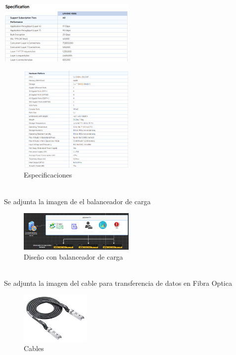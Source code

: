     \includegraphics[width=0.5\textwidth]{assets/sp1.png}\\
    \begin{figure}[htb]
        \centering
        \includegraphics[width=0.5\textwidth]{assets/sp2.png}
        \caption{Especificaciones}
        \label{fig:modelo}
        \end{figure}
        \label{sec:Background} \\
    
        Se adjunta la imagen de el balanceador de carga
        \begin{figure}[htb]
        \centering
        \includegraphics[width=0.5\textwidth]{assets/dbc.png}
        \caption{Diseño con balanceador de carga}
        \label{fig:modelo}
        \end{figure}
        \label{sec:Background} \\

        Se adjunta la imagen del cable para transferencia de datos en Fibra Optica
        \begin{figure}[htb]
        \centering
        \includegraphics[width=0.3\textwidth]{assets/cable.png}
        \caption{Cables}
        \label{fig:modelo}
        \end{figure}
        \label{sec:Background} \\


